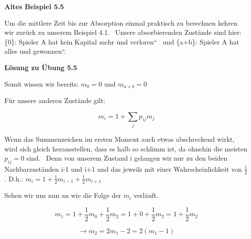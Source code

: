 \begin{uebsp}

{\centering\bfseries
Altes Beispiel 5.5
\par}


{}
Um die mittlere Zeit bis zur Absorption einmal praktisch zu berechnen
kehren wir zur\"uck zu unserem Beispiel 4.1. \ Unsere absorbierenden
Zust\"ande sind hier: \{0\}: {\quotedblbase}Spieler A hat kein Kapital
mehr und verloren{\textquotedblleft} \ und \{a+b\}:
{\quotedblbase}Spieler A hat alles und gewonnen{\textquotedblleft}.\\


\begin{center}\textbf{Lösung zu Übung 5.5}\end{center}


Somit wissen wir bereits:  $m_{0}=0$ und  $m_{a+b}=0$ 



F\"ur unsere anderen Zust\"ande gilt: 

\begin{equation*}
m_{i}=1+\sum _{j}p_{\mathit{ij}}m_{j}
\end{equation*}


Wenn das Summenzeichen im ersten Moment auch etwas abschreckend wirkt,
wird sich gleich herausstellen, dass es halb so schlimm ist, da ohnehin
die meisten  $p_{\mathit{ij}}=0$ sind. \ Denn von unserem Zustand i
gelangen wir nur zu den beiden Nachbarzust\"anden i-1 und i+1 und das
jeweils mit einer Wahrscheinlichkeit von  $\frac{1}{2}$ . D.h.: 
$m_{i}=1+\frac{1}{2}m_{i-1}+\frac{1}{2}m_{i+1}$



Sehen wir uns nun an wie die Folge der  $m_{i}$ verl\"auft. 





\begin{equation*}
m_{1}=1+\frac{1}{2}m_{0}+\frac{1}{2}m_{2}=1+0+\frac{1}{2}m_{2}=1+\frac{1}{2}m_{2}
\end{equation*}


\begin{equation*}
\rightarrow m_{2}=2m_{1}-2=2(m_{1}-1)
\end{equation*}



\end{uebsp}
